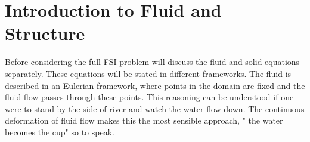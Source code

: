 \chapter{Introduction to Fluid and Structure}
Before considering the full FSI problem will discuss the fluid and solid equations separately. These equations will be stated in different frameworks. The fluid is described in an Eulerian framework, where points in the domain are fixed and the fluid flow passes through these points. This reasoning can be understood if one were to stand by the side of river and watch the water flow down. The continuous deformation of fluid flow makes this the most sensible approach, " the water becomes the cup" so to speak.